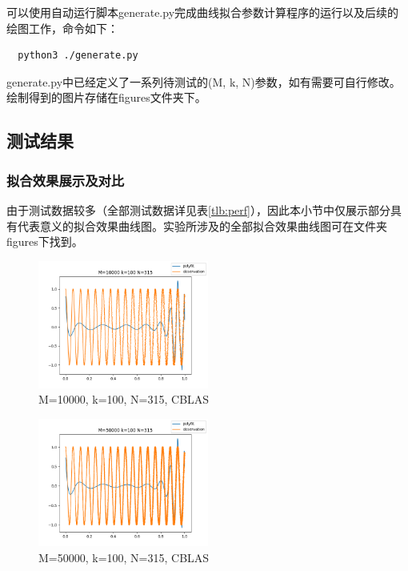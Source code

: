 \documentclass[a4paper]{article}
\begin{document}
可以使用自动运行脚本generate.py完成曲线拟合参数计算程序的运行以及后续的绘图工作，命令如下：
\begin{lstlisting}
  python3 ./generate.py
\end{lstlisting}
generate.py中已经定义了一系列待测试的(M, k, N)参数，如有需要可自行修改。绘制得到的图片存储在figures文件夹下。

\subsection{测试结果}
\subsubsection{拟合效果展示及对比}
由于测试数据较多（全部测试数据详见表\ref{tlb:perf}），因此本小节中仅展示部分具有代表意义的拟合效果曲线图。实验所涉及的全部拟合效果曲线图可在文件夹figures下找到。

\begin{figure}[tbp]
  \centering
  \includegraphics[width=0.5\textwidth]{figures/lapack/figure0_M_10000_k_100_N_315.png}
  \caption{M=10000, k=100, N=315, CBLAS}
  \label{fig:exp1}
\end{figure}

\begin{figure}[tbp]
  \centering
  \includegraphics[width=0.5\textwidth]{figures/lapack/figure1_M_50000_k_100_N_315.png}
  \caption{M=50000, k=100, N=315, CBLAS}
  \label{fig:exp2}
\end{figure}
\end{document}
